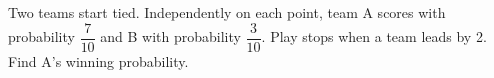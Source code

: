 Two teams start tied. Independently on each point, team A scores with probability $\dfrac{7}{10}$ and B with probability $\dfrac{3}{10}$. Play stops when a team leads by 2. Find A's winning probability.

